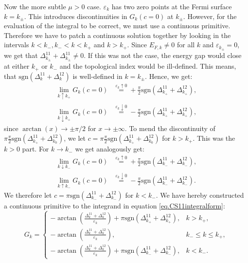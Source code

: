 Now the more subtle $\mu > 0$ case. $\varepsilon_k$ has two zero points at the Fermi surface $k = k_\pm$. This introduces discontinuities in $G_k(c=0)$ at $k_\pm$. However, for the evaluation of the integral to be correct, we must use a continuous primitive. Therefore we have to patch a continuous solution together by looking in the intervals $k < k_-, k_- < k < k_+$ and $k>k_+$. Since $E_{F,k} \neq 0$ for all $k$ and $\varepsilon_{k_\pm} = 0$, we get that $\Delta^{11}_{k_\pm} + \Delta^{11}_{k_\pm} \neq 0$. If this was not the case, the energy gap would close at either $k_+$ or $k_-$ and the topological index would be ill-defined. This means, that $\text{sgn}(\Delta^{11}_k + \Delta^{12}_k)$ is well-defined in $k = k_\pm$. Hence, we get:
\begin{align}
\lim_{k \uparrow k_+} G_k(c = 0)   &\overset{\varepsilon_k \uparrow 0}{=}   +\frac{\pi}{2}\text{sgn}(\Delta^{11}_{k_+} + \Delta^{12}_{k_+}), \nonumber \\
\lim_{k \downarrow k_+} G_k(c = 0) &\overset{\varepsilon_k \downarrow 0}{=} -\frac{\pi}{2}\text{sgn}(\Delta^{11}_{k_+} + \Delta^{12}_{k_+}),
\label{eq.2wires.CS11.kpluslimit}
\end{align}
since $\arctan(x) \to \pm \pi/2$ for $x \to \pm \infty$. To mend the discontinuity of $\pi\frac{\pi}{2}\text{sgn}(\Delta^{11}_{k_+} + \Delta^{12}_{k_0})$, we let $c = \pi\frac{\pi}{2}\text{sgn}(\Delta^{11}_{k_+} + \Delta^{12}_{k_0})$ for $k > k_+$. This was the $k > 0$ part. For $k \to k_-$ we get analogously get:
\begin{align}
\lim_{k \downarrow k_-} G_k(c = 0) &\overset{\varepsilon_k \uparrow 0}{=} +\frac{\pi}{2}\text{sgn}(\Delta^{11}_{k_-} + \Delta^{12}_{k_-}), \nonumber \\
\lim_{k \uparrow k_-} G_k(c = 0)   &\overset{\varepsilon_k \downarrow 0}{=} -\frac{\pi}{2}\text{sgn}(\Delta^{11}_{k_-} + \Delta^{12}_{k_-}).
\label{eq.2wires.CS11.kminuslimit}
\end{align}
We therefore let $c = \pi \text{sgn}(\Delta^{11}_{k_-} + \Delta^{12}_{k_-})$ for $k < k_-$. We have hereby constructed a continuous primitive to the integrand in equation \eqref{eq.CS11integralform}:
\begin{equation}
G_k = \left\{ \begin{matrix} 
-\arctan\left(\frac{\Delta^{11}_k + \Delta^{12}_k }{\varepsilon_k}\right) + \pi\text{sgn}(\Delta^{11}_{k_+} + \Delta^{12}_{k_+}), & k > k_+, \\
-\arctan\left(\frac{\Delta^{11}_k + \Delta^{12}_k }{\varepsilon_k}\right), & k_- \leq k \leq k_+, \\
-\arctan\left(\frac{\Delta^{11}_k + \Delta^{12}_k }{\varepsilon_k}\right) + \pi \text{sgn}(\Delta^{11}_{k_-} + \Delta^{12}_{k_-}), & k < k_-.
  \end{matrix} \right.
\label{eq.Gkmugreater0}
\end{equation}

